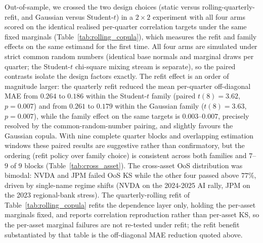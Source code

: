 Out-of-sample, we crossed the two design choices (static versus rolling-quarterly-refit, and Gaussian versus Student-$t$) in a $2 \times 2$ experiment with all four arms scored on the identical realised per-quarter correlation targets under the same fixed marginals (Table~\ref{tab:rolling_copula}), which measures the refit and family effects on the same estimand for the first time. All four arms are simulated under strict common random numbers (identical base normals and marginal draws per quarter; the Student-$t$ chi-square mixing stream is separate), so the paired contrasts isolate the design factors exactly. The refit effect is an order of magnitude larger: the quarterly refit reduced the mean per-quarter off-diagonal MAE from $0.264$ to $0.186$ within the Student-$t$ family (paired $t(8) = 3.62$, $p = 0.007$) and from $0.261$ to $0.179$ within the Gaussian family ($t(8) = 3.63$, $p = 0.007$), while the family effect on the same targets is $0.003$--$0.007$, precisely resolved by the common-random-number pairing, and slightly favours the Gaussian copula. With nine complete quarter blocks and overlapping estimation windows these paired results are suggestive rather than confirmatory, but the ordering (refit policy over family choice) is consistent across both families and $7$--$9$ of $9$ blocks (Table~\ref{tab:cross_asset}). The cross-asset OoS distribution was bimodal: NVDA and JPM failed OoS KS while the other four passed above $77\%$, driven by single-name regime shifts (NVDA on the 2024-2025 AI rally, JPM on the 2023 regional-bank stress). The quarterly-rolling refit of Table~\ref{tab:rolling_copula} refits the dependence layer only, holding the per-asset marginals fixed, and reports correlation reproduction rather than per-asset KS, so the per-asset marginal failures are not re-tested under refit; the refit benefit substantiated by that table is the off-diagonal MAE reduction quoted above.


